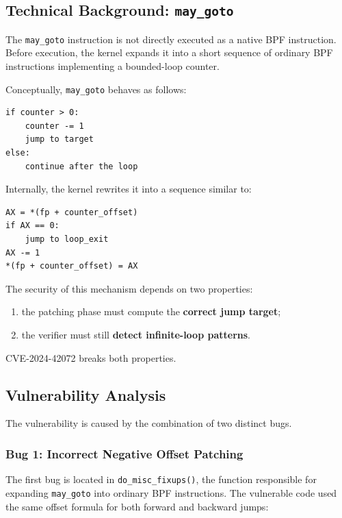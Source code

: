 \documentclass[../main.tex]{subfiles}
\begin{document}
\subsection{Technical Background: \texttt{may\_goto}}

The \texttt{may\_goto} instruction is not directly executed as a native BPF instruction. Before execution, the kernel expands it into a short sequence of ordinary BPF instructions implementing a bounded-loop counter.

Conceptually, \texttt{may\_goto} behaves as follows:

\begin{lstlisting}[caption={Expected \texttt{may\_goto} semantics.}]
if counter > 0:
    counter -= 1
    jump to target
else:
    continue after the loop
\end{lstlisting}

Internally, the kernel rewrites it into a sequence similar to:

\begin{lstlisting}[caption={Simplified \texttt{may\_goto} expansion.}]
AX = *(fp + counter_offset)
if AX == 0:
    jump to loop_exit
AX -= 1
*(fp + counter_offset) = AX
\end{lstlisting}

The security of this mechanism depends on two properties:

\begin{enumerate}
    \item the patching phase must compute the \textbf{correct jump target};
    \item the verifier must still \textbf{detect infinite-loop patterns}.
\end{enumerate}

CVE-2024-42072 breaks both properties.

\subsection{Vulnerability Analysis}

The vulnerability is caused by the combination of two distinct bugs.

\subsubsection{Bug 1: Incorrect Negative Offset Patching}

The first bug is located in \texttt{do\_misc\_fixups()}, the function responsible for expanding \texttt{may\_goto} into ordinary BPF instructions. The vulnerable code used the same offset formula for both forward and backward jumps:
\end{document}
